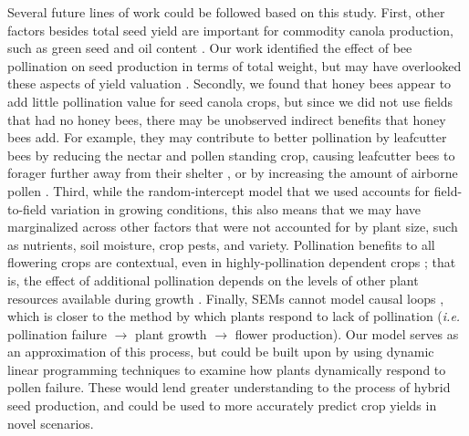 \documentclass[12pt, draft]{article} %
\begin{document}
Several future lines of work could be followed based on this study.
First, other factors besides total seed yield are important for commodity canola production, such as green seed and oil content \citep{tautorus1994, abbadi2011, ghazani2013}.
Our work identified the effect of bee pollination on seed production in terms of total weight, but may have overlooked these aspects of yield valuation \citep{bommarco2012}. 
Secondly, we found that honey bees appear to add little pollination value for seed canola crops, but since we did not use fields that had no honey bees, there may be unobserved indirect benefits that honey bees add.
For example, they may contribute to better pollination by leafcutter bees by reducing the nectar and pollen standing crop, causing leafcutter bees to forager further away from their shelter \citep{pyke1978b, heinrich1979}, or by increasing the amount of airborne pollen \citep{eisikowitch1981,mesquida1982}.
Third, while the random-intercept model that we used accounts for field-to-field variation in growing conditions, this also means that we may have marginalized across other factors that were not accounted for by plant size, such as nutrients, soil moisture, crop pests, and variety.
Pollination benefits to all flowering crops are contextual, even in highly-pollination dependent crops \citep{tamburini2017, tamburini2019}; that is, the effect of additional pollination depends on the levels of other plant resources available during growth \citep{marini2015, bartomeus2015, gagic2017}.
Finally, SEMs cannot model causal loops \citep{grace2006}, which is closer to the method by which plants respond to lack of pollination (\emph{i.e.} pollination failure $\rightarrow$ plant growth $\rightarrow$ flower production).
Our model serves as an approximation of this process, but could be built upon by using dynamic linear programming techniques \citep{iwasa2000,nord2011} to examine how plants dynamically respond to pollen failure.
These would lend greater understanding to the process of hybrid seed production, and could be used to more accurately predict crop yields in novel scenarios.


\singlespacing




\clearpage %



\end{document}
